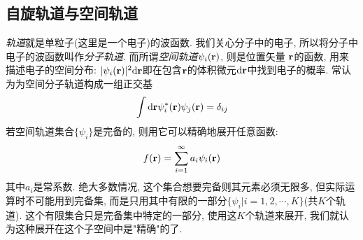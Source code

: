  \subsection{自旋轨道与空间轨道}
 \label{sec2.2.1}
 \emph{轨道}就是单粒子(这里是一个电子)的波函数. 我们关心分子中的电子, 所以将分子中电子的波函数叫作\emph{分子轨道}. 而所谓\emph{空间轨道}$\psi_i(\mathbf{r})$, 则是位置矢量 $\mathbf{r}$的函数, 用来描述电子的空间分布: $|\psi_i(\bo{r})|^2\dd \bo{r}$即在包含$\mathbf{r}$的体积微元$\dd\bo{r}$中找到电子的概率. 常认为为空间分子轨道构成一组正交基
 \begin{equation}
 \int\dd\bo{r}\psi_i^*(\bo{r})\psi_j(\bo{r})=\delta_{ij}
 \end{equation}
 若空间轨道集合$\{\psi_i \}$是完备的, 则用它可以精确地展开任意函数:
 \begin{equation}
 f(\mathbf{r})=\sum_{i=1}^{\infty}a_i\psi_i(\mathbf{r})
 \end{equation}
其中$a_i$是常系数. 绝大多数情况, 这个集合想要完备则其元素必须无限多, 但实际运算时不可能用到完备集, 而是只用其中有限的一部分$\{\psi_i|i=1,2,\cdots,K\}$(共$K$个轨道). 这个有限集合只是完备集中特定的一部分, 使用这$K$个轨道来展开, 我们就认为这种展开在这个子空间中是"精确"的了.

